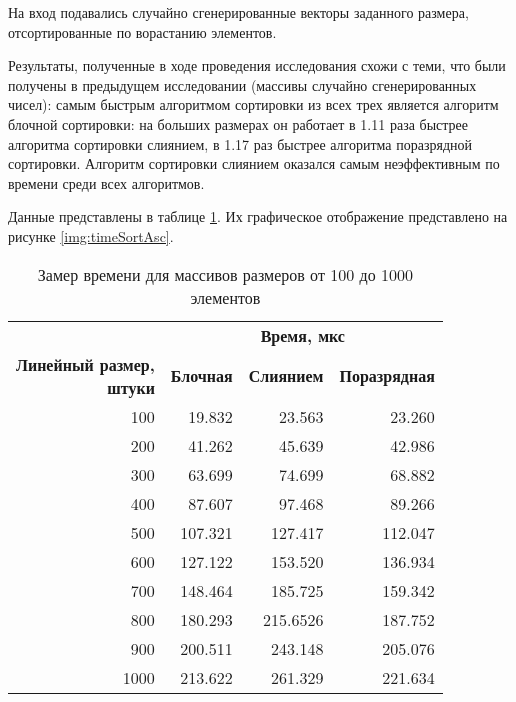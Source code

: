 На вход подавались случайно сгенерированные векторы заданного размера, отсортированные по ворастанию элементов.

Результаты, полученные в ходе проведения исследования схожи с теми, что были получены в предыдущем исследовании (массивы случайно сгенерированных чисел):
самым быстрым алгоритмом сортировки из всех трех является алгоритм блочной сортировки: на больших размерах он работает в 1.11 раза быстрее алгоритма сортировки слиянием, в 1.17 раз быстрее алгоритма поразрядной сортировки. Алгоритм сортировки слиянием оказался самым неэффективным по времени среди всех алгоритмов.

Данные представлены в таблице \ref{tbl:timeAsc}. Их графическое отображение представлено на рисунке \ref{img:timeSortAsc}.

\begin{table}[ht]
	\small
	\begin{center}
		\begin{threeparttable}
			\caption{Замер времени для массивов размеров от 100 до 1000 элементов}
			\label{tbl:timeAsc}
			\begin{tabular}{|r|r|r|r|}
				\hline
				& \multicolumn{3}{c|}{\bfseries Время, мкс} \\ \cline{2-4}
				\bfseries \makecell{Линейный размер, \\ штуки} & \bfseries Блочная & \bfseries Слиянием & \bfseries Поразрядная \\ \cline{2-4}
				\hline
				100 & 19.832 & 23.563 & 23.260 \\
				\hline
				200 & 41.262 & 45.639 & 42.986 \\
				\hline
				300 & 63.699 & 74.699 & 68.882 \\
				\hline
				400 & 87.607 & 97.468 & 89.266 \\
				\hline
				500 & 107.321 & 127.417 & 112.047 \\
				\hline
				600 & 127.122 & 153.520 & 136.934 \\
				\hline
				700 & 148.464 & 185.725 & 159.342 \\
				\hline
				800 & 180.293 & 215.6526 & 187.752 \\
				\hline
				900 & 200.511 & 243.148 & 205.076 \\
				\hline
				1000 & 213.622 & 261.329 & 221.634 \\
				\hline
			\end{tabular}	
		\end{threeparttable}
	\end{center}
\end{table}

